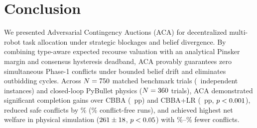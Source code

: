 \documentclass[lettersize,journal]{IEEEtran}
\begin{document}
\section{Conclusion}
We presented Adversarial Contingency Auctions (ACA) for decentralized multi-robot task allocation under strategic blockages and belief divergence. By combining type-aware expected recourse valuation with an analytical Pinsker margin and consensus hysteresis deadband, ACA provably guarantees zero simultaneous Phase-1 conflicts under bounded belief drift and eliminates outbidding cycles. Across $N = 750$ matched benchmark trials (\aeBenchmarkClusters\ independent instances) and closed-loop PyBullet physics ($N = 360$ trials), ACA demonstrated significant completion gains over CBBA (\aeCompletionDiffCbba~pp) and CBBA+LR (\aeHtwoCbbaLrDiff~pp, $p < 0.001$), reduced safe conflicts by \aeHfourSafeConflictReductionPct\% (\aeConflictFreeRunPct\% conflict-free runs), and achieved highest net welfare in physical simulation ($261 \pm 18$, $p < 0.05$) with \aeSitlConflictReductionNoMarginPct\%--\aeSitlConflictReductionCbbaPrLrPct\% fewer conflicts.

\def\BIBdecl{\setlength{\itemsep}{0pt plus 0.2pt}\setlength{\parsep}{0pt}}


\end{document}
